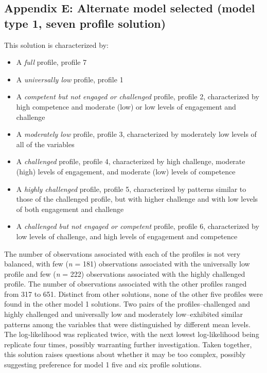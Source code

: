 \documentclass[]{book}
\providecommand{\tightlist}{%
  \setlength{\itemsep}{0pt}\setlength{\parskip}{0pt}}
\theoremstyle{definition}
\theoremstyle{definition}
\theoremstyle{definition}
\theoremstyle{remark}
\begin{document}
\subsection{Appendix E: Alternate model selected (model type 1, seven
profile
solution)}\label{appendix-e-alternate-model-selected-model-type-1-seven-profile-solution}

This solution is characterized by:

\begin{itemize}
\tightlist
\item
  A \emph{full} profile, profile 7
\item
  A \emph{universally low} profile, profile 1
\item
  A \emph{competent but not engaged or challenged} profile, profile 2,
  characterized by high competence and moderate (low) or low levels of
  engagement and challenge
\item
  A \emph{moderately low} profile, profile 3, characterized by
  moderately low levels of all of the variables
\item
  A \emph{challenged} profile, profile 4, characterized by high
  challenge, moderate (high) levels of engagement, and moderate (low)
  levels of competence
\item
  A \emph{highly challenged} profile, profile 5, characterized by
  patterns similar to those of the challenged profile, but with higher
  challenge and with low levels of both engagement and challenge
\item
  A \emph{challenged but not engaged or competent} profile, profile 6,
  characterized by low levels of challenge, and high levels of
  engagement and competence
\end{itemize}

The number of observations associated with each of the profiles is not
very balanced, with few (\emph{n} = 181) observations associated with
the universally low profile and few (\emph{n} = 222) observations
associated with the highly challenged profile. The number of
observations associated with the other profiles ranged from 317 to 651.
Distinct from other solutions, none of the other five profiles were
found in the other model 1 solutions. Two pairs of the
profiles--challenged and highly challenged and universally low and
moderately low--exhibited similar patterns among the variables that were
distinguished by different mean levels. The log-likelihood was
replicated twice, with the next lowest log-likelihood being replicate
four times, possibly warranting further investigation. Taken together,
this solution raises questions about whether it may be too complex,
possibly suggesting preference for model 1 five and six profile
solutions.


\end{document}
